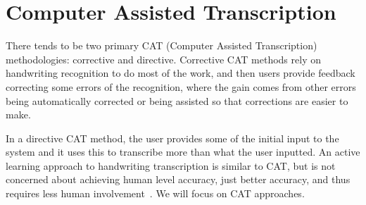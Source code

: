 \documentclass[ms,electronic,twosidetoc,letterpaper,chaptercenter,parttop,lol,lof,lot]{byumsphd}
\begin{document}


\section{Computer Assisted Transcription} %

There tends to be two primary CAT (Computer Assisted Transcription) methodologies: corrective and directive. Corrective CAT methods rely on handwriting recognition to do most of the work, and then users provide feedback correcting some errors of the recognition, where the gain comes from other errors being automatically corrected or being assisted so that corrections are easier to make.

In a directive CAT method, the user provides some of the initial input to the system and it uses this to transcribe more than what the user inputted.
An active learning approach to handwriting transcription is similar to CAT, but is not concerned about achieving human level accuracy, just better accuracy, and thus requires less human involvement~\cite{Serrano2010}. 
We will focus on CAT approaches.
\end{document}
